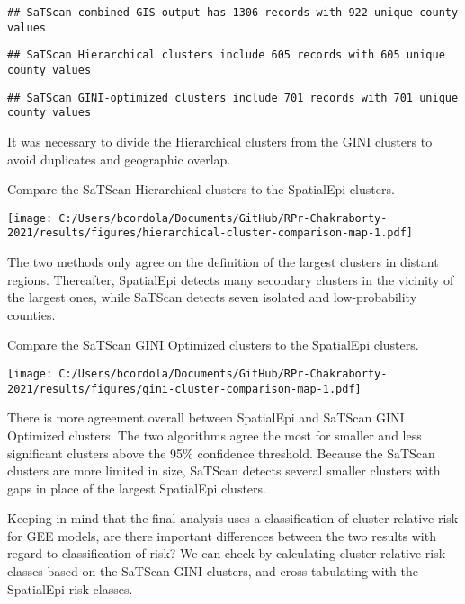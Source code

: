\documentclass[
]{article}
\begin{document}
\begin{verbatim}
## SaTScan combined GIS output has 1306 records with 922 unique county values
\end{verbatim}

\begin{verbatim}
## SaTScan Hierarchical clusters include 605 records with 605 unique county values
\end{verbatim}

\begin{verbatim}
## SaTScan GINI-optimized clusters include 701 records with 701 unique county values
\end{verbatim}

It was necessary to divide the Hierarchical clusters from the GINI
clusters to avoid duplicates and geographic overlap.

Compare the SaTScan Hierarchical clusters to the SpatialEpi clusters.

\texttt{[image: C:/Users/bcordola/Documents/GitHub/RPr-Chakraborty-2021/results/figures/hierarchical-cluster-comparison-map-1.pdf]}

The two methods only agree on the definition of the largest clusters in
distant regions. Thereafter, SpatialEpi detects many secondary clusters
in the vicinity of the largest ones, while SaTScan detects seven
isolated and low-probability counties.

Compare the SaTScan GINI Optimized clusters to the SpatialEpi clusters.

\texttt{[image: C:/Users/bcordola/Documents/GitHub/RPr-Chakraborty-2021/results/figures/gini-cluster-comparison-map-1.pdf]}

There is more agreement overall between SpatialEpi and SaTScan GINI
Optimized clusters. The two algorithms agree the most for smaller and
less significant clusters above the 95\% confidence threshold. Because
the SaTScan clusters are more limited in size, SaTScan detects several
smaller clusters with gaps in place of the largest SpatialEpi clusters.

Keeping in mind that the final analysis uses a classification of cluster
relative risk for GEE models, are there important differences between
the two results with regard to classification of risk? We can check by
calculating cluster relative risk classes based on the SaTScan GINI
clusters, and cross-tabulating with the SpatialEpi risk classes.
\end{document}
